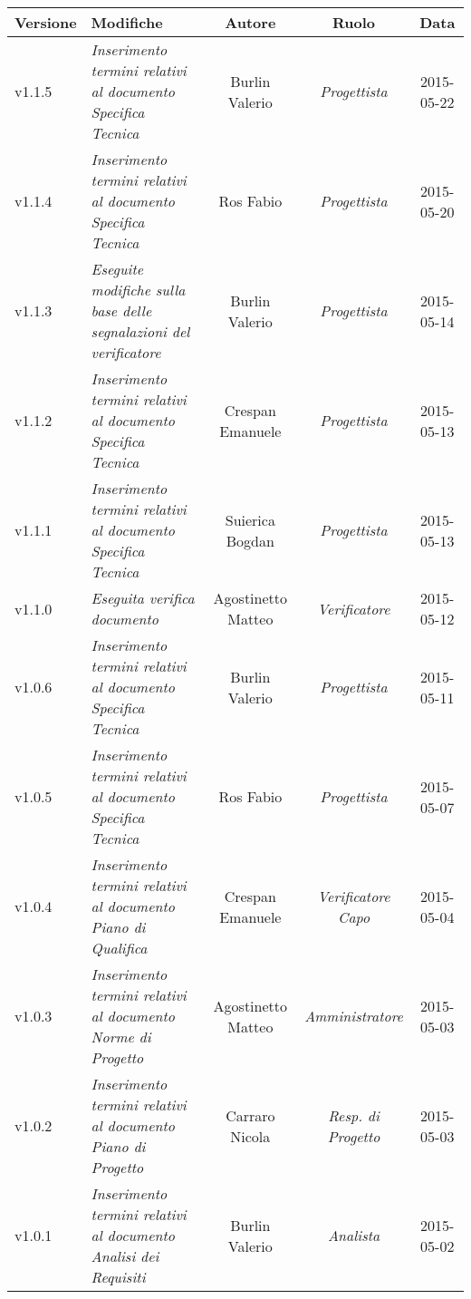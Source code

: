 \begin{table}[H]
\centering
\begin{tabular}{|p{}|p{}|c|c|c|}
	\toprule
		\textbf{Versione} & \textbf{Modifiche} & \textbf{Autore} & \textbf{Ruolo} & \textbf{Data} \\
	\midrule
	\midrule
		v1.1.5 & \textit{Inserimento termini relativi al documento Specifica Tecnica} & Burlin Valerio & \textit{Progettista} & 2015-05-22\\
	\midrule
		v1.1.4 & \textit{Inserimento termini relativi al documento Specifica Tecnica} & Ros Fabio & \textit{Progettista} & 2015-05-20\\
	\midrule
		v1.1.3 & \textit{Eseguite modifiche sulla base delle segnalazioni del verificatore} & Burlin Valerio & \textit{Progettista} & 2015-05-14\\
	\midrule
		v1.1.2 & \textit{Inserimento termini relativi al documento Specifica Tecnica} & Crespan Emanuele & \textit{Progettista} & 2015-05-13\\
	\midrule
		v1.1.1 & \textit{Inserimento termini relativi al documento Specifica Tecnica} & Suierica Bogdan & \textit{Progettista} & 2015-05-13\\
	\midrule
		v1.1.0 & \textit{Eseguita verifica documento} & Agostinetto Matteo & \textit{Verificatore} & 2015-05-12\\
	\midrule
		v1.0.6 & \textit{Inserimento termini relativi al documento Specifica Tecnica} & Burlin Valerio & \textit{Progettista} & 2015-05-11\\
	\midrule
		v1.0.5 & \textit{Inserimento termini relativi al documento Specifica Tecnica} & Ros Fabio & \textit{Progettista} & 2015-05-07\\
	\midrule
		v1.0.4 & \textit{Inserimento termini relativi al documento Piano di Qualifica} & Crespan Emanuele & \textit{Verificatore Capo} & 2015-05-04\\
	\midrule
		v1.0.3 & \textit{Inserimento termini relativi al documento Norme di Progetto} & Agostinetto Matteo & \textit{Amministratore} & 2015-05-03\\
	\midrule
		 v1.0.2 & \textit{Inserimento termini relativi al documento Piano di Progetto} & Carraro Nicola & \textit{Resp. di Progetto} & 2015-05-03 \\
	\midrule
		  v1.0.1 & \textit{Inserimento termini relativi al documento Analisi dei Requisiti} & Burlin Valerio & \textit{Analista} & 2015-05-02 \\
	\bottomrule
\end{tabular}	
\end{table}

